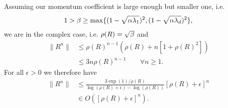 \begin{theorem}
	Assuming our momentum coefficient is large enough but smaller one, i.e.
	\begin{align*}
		1>\beta
		\ge \max\{(1-\sqrt{\alpha\lambda_1})^2, (1-\sqrt{\alpha\lambda_d})^2\},
	\end{align*}
	we are in the complex case, i.e. \(\rho(R) = \sqrt{\beta}\) and
	\begin{align*}
		\|R^n\|
		&\le \rho(R)^{n-1}(\rho(R)+n[1+\rho(R)^2])\\
		&\le 3n\rho(R)^{n-1} \qquad \forall n\ge 1.
	\end{align*}
	For all \(\epsilon>0\) we therefore have
	\begin{align*}
		\|R^n\|
		&\le \frac{3\exp(1)/\rho(R)}{\log(\rho(R)+\epsilon)-\log(\rho(R))}
		[\rho(R)+\epsilon]^n
		\\
		&\in O([\rho(R)+\epsilon]^n).
	\end{align*}
\end{theorem}
